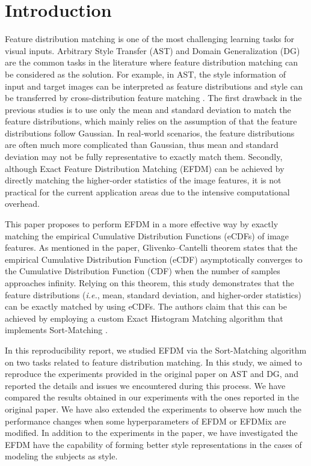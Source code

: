 \section{Introduction}
Feature distribution matching is one of the most challenging learning tasks for visual inputs. Arbitrary Style Transfer (AST) and Domain Generalization (DG) are the common tasks in the literature where feature distribution matching can be considered as the solution. For example, in AST, the style information of input and target images can be interpreted as feature distributions and style can be transferred by cross-distribution feature matching \cite{huang2017arbitrary,li2017demystifying,li2019optimal,lu2019closed,mroueh2020wasserstein,zhou2020domain,kalischek2021light}. The first drawback in the previous studies is to use only the mean and standard deviation to match the feature distributions, which mainly relies on the assumption of that the feature distributions follow Gaussian. In real‐world scenarios, the feature distributions are often much more complicated than Gaussian, thus mean and standard deviation may not be fully representative to exactly match them. Secondly, although Exact Feature Distribution Matching (EFDM) can be achieved by directly matching the higher-order statistics of the image features, it is not practical for the current application areas due to the intensive computational overhead.

This paper \cite{zhang2021exact} proposes to perform EFDM in a more effective way by exactly matching the empirical Cumulative Distribution Functions (eCDFs) of image features. As mentioned in the paper, Glivenko–Cantelli theorem \cite{van2000asymptotic} states that the empirical Cumulative Distribution Function (eCDF) asymptotically converges to the Cumulative Distribution Function (CDF) when the number of samples approaches infinity. Relying on this theorem, this study demonstrates that the feature distributions (\textit{i.e.}, mean, standard deviation, and higher-order statistics) can be exactly matched by using eCDFs. The authors claim that this can be achieved by employing a custom Exact Histogram Matching algorithm that implements Sort-Matching \cite{rolland2000fast}.

In this reproducibility report, we studied EFDM via the Sort-Matching algorithm on two tasks related to feature distribution matching. In this study, we aimed to reproduce the experiments provided in the original paper on AST and DG, and reported the details and issues we encountered during this process. %
We have compared the results obtained in our experiments with the ones reported in the original paper. We have also extended the experiments to observe how much the performance changes when some hyperparameters of EFDM or EFDMix are modified. In addition to the experiments in the paper, we have investigated the EFDM have the capability of forming better style representations in the cases of modeling the subjects as style.


